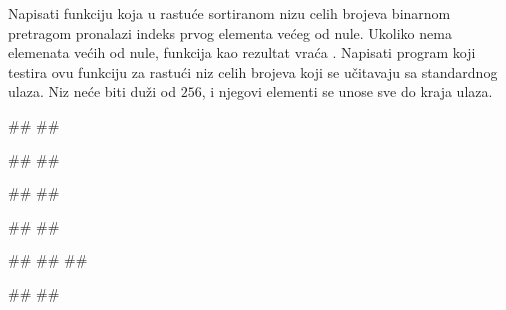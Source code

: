 \begin{Answer}[ref=406]
\end{Answer}
\begin{Exercise}[label=407]
Napisati funkciju koja u rastuće sortiranom nizu celih brojeva
binarnom pretragom pronalazi indeks prvog elementa većeg od
nule. Ukoliko nema elemenata većih od nule, funkcija kao rezultat
vraća . Napisati program koji testira ovu funkciju za rastući
niz celih brojeva koji se učitavaju sa standardnog ulaza. Niz neće biti
duži od $256$, i njegovi elementi se unose sve do kraja ulaza.

\begin{minitest}
\begin{test}{1}
#\naslovUlaz#
##

#\naslovIzlaz#
##
\end{test}
\end{minitest}
\begin{minitest}
\begin{test}{2}
#\naslovUlaz#
##

#\naslovIzlaz#
##
\end{test}
\end{minitest}
\begin{minitest}
\begin{test}{3}
#\naslovUlaz#
##
##
  
#\naslovIzlaz#
##
\end{test}
\end{minitest}


\end{Exercise}
\begin{Answer}[ref=407]
\end{Answer}

